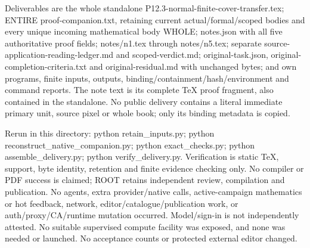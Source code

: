 Deliverables are the whole standalone
P12.3-normal-finite-cover-transfer.tex; ENTIRE proof-companion.txt,
retaining current actual/formal/scoped bodies and every unique incoming
mathematical body WHOLE; notes.json with all five authoritative proof
fields; notes/n1.tex through notes/n5.tex; separate
source-application-reading-ledger.md and scoped-verdict.md;
original-task.json, original-completion-criteria.txt and
original-residual.md with unchanged bytes; and own programs, finite inputs,
outputs, binding/containment/hash/environment and command reports.
The note text is its complete TeX proof fragment, also contained in the
standalone. No public delivery contains a literal immediate primary unit,
source pixel or whole book; only its binding metadata is copied.

Rerun in this directory: python retain\_inputs.py;
python reconstruct\_native\_companion.py; python exact\_checks.py;
python assemble\_delivery.py; python verify\_delivery.py.
Verification is static TeX, support, byte identity, retention and finite
evidence checking only. No compiler or PDF success is claimed; ROOT
retains independent review, compilation and publication. No agents,
extra provider/native calls, active-campaign mathematics or hot feedback,
network, editor/catalogue/publication work, or auth/proxy/CA/runtime
mutation occurred. Model/sign-in is not independently attested.
No suitable supervised compute facility was exposed, and none was needed
or launched. No acceptance counts or protected external editor changed.
